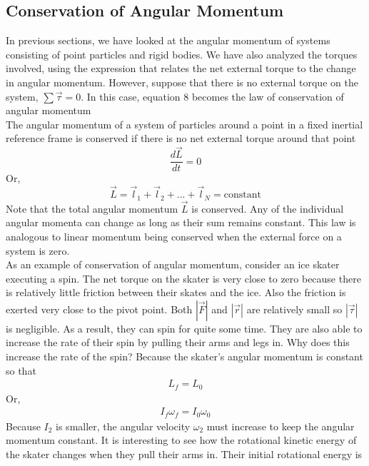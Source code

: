 \documentclass[a4paper]{article}
\newcommand\der[2]{\frac{d #1}{d #2}}
\begin{document}
\subsection{Conservation of Angular Momentum}
In previous sections, we have looked at the angular momentum of systems consisting of point particles and rigid bodies. We have also analyzed the torques involved, using the expression that relates the net external torque to the change in angular momentum. However, suppose that there is no external torque on the system, $\sum\vec{\tau} = 0$. In this case, equation 8 becomes the law of conservation of angular momentum
\vspace{1mm}\\
The angular momentum of a system of particles around a point in a fixed inertial reference frame is conserved if there is no net external torque around that point
\begin{equation}
    \der{\vec{L}}{t} = 0
\end{equation}
Or,
\begin{equation}
    \vec{L} = \vec{l}_1 + \vec{l}_2 + ... + \vec{l}_N = \text{constant}
\end{equation}
Note that the total angular momentum $\vec{L}$ is conserved. Any of the individual angular momenta can change as long as their sum remains constant. This law is analogous to linear momentum being conserved when the external force on a system is zero.
\vspace{1mm}\\
As an example of conservation of angular momentum, consider an ice skater executing a spin. The net torque on the skater is very close to zero because there is relatively little friction between their skates and the ice. Also the friction is exerted very close to the pivot point. Both $|\vec{F}|$ and $|\vec{r}|$ are relatively small so $|\vec{\tau}|$ is negligible. As a result, they can spin for quite some time. They are also able to increase the rate of their spin by pulling their arms and legs in. Why does this increase the rate of the spin? Because the skater's angular momentum is constant so that
\begin{align*}
    L_f = L_0
\end{align*}
Or,
\begin{align*}
    I_f\omega_f = I_0\omega_0
\end{align*}
Because $I_2$ is smaller, the angular velocity $\omega_2$ must increase to keep the angular momentum constant. It is interesting to see how the rotational kinetic energy of the skater changes when they pull their arms in. Their initial rotational energy is
\end{document}
